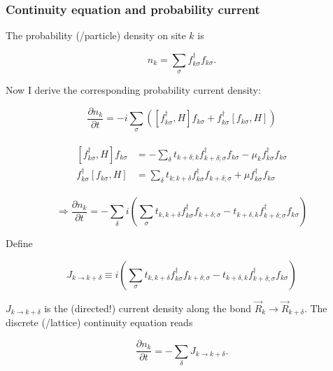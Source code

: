 \documentclass{article}
\begin{document}
\subsubsection{Continuity equation and probability current}

The probability (/particle) density on site $k$ is 

\begin{equation}
	n_k = \sum_\sigma f_{k\sigma}^\dagger f_{k\sigma}.
\end{equation}

Now I derive the corresponding probability current density:

\begin{equation}
	\frac{\partial n_k}{\partial t} = -i\sum_\sigma\left([f_{k\sigma}^\dagger, H]f_{k\sigma} + f_{k\sigma}^\dagger [f_{k\sigma},H]\right)
\end{equation}

\begin{align}
	\begin{split}
		[f_{k\sigma}^\dagger, H]f_{k\sigma} &= - \sum\limits_{\delta} t_{k+\delta;k}f_{k+\delta;\sigma}^\dagger f_{k\sigma} - \mu_k f_{k\sigma}^\dagger f_{k\sigma}\\
		f_{k\sigma}^\dagger [f_{k\sigma}, H] &= \sum\limits_{\delta} t_{k;k+\delta}f_{k\sigma}^\dagger f_{k+\delta;\sigma} + \mu f_{k\sigma}^\dagger f_{k\sigma}
	\end{split}
\end{align}

\begin{equation}
	\Rightarrow \frac{\partial n_k}{\partial t}= -\sum_\delta i \left( \sum_{\sigma} t_{k,k+\delta} f_{k\sigma}^\dagger f_{k+\delta;\sigma}-t_{k+\delta,k} f_{k+\delta;\sigma}^\dagger f_{k\sigma} \right)
\end{equation}

Define 

\begin{equation}
	J_{k \rightarrow k+\delta} \equiv i \left( \sum_{\sigma} t_{k,k+\delta} f_{k\sigma}^\dagger f_{k+\delta;\sigma}-t_{k+\delta,k} f_{k+\delta;\sigma}^\dagger f_{k\sigma} \right) 
\end{equation}

$J_{k \rightarrow k+\delta}$ is the (directed!) current density along the bond $\vec{R}_k \rightarrow \vec{R}_{k+\delta}$. The discrete (/lattice) continuity equation reads

\begin{equation}
	\frac{\partial n_k}{\partial t} = -\sum_{\delta} J_{k \rightarrow k+\delta}.
\end{equation}
\end{document}
